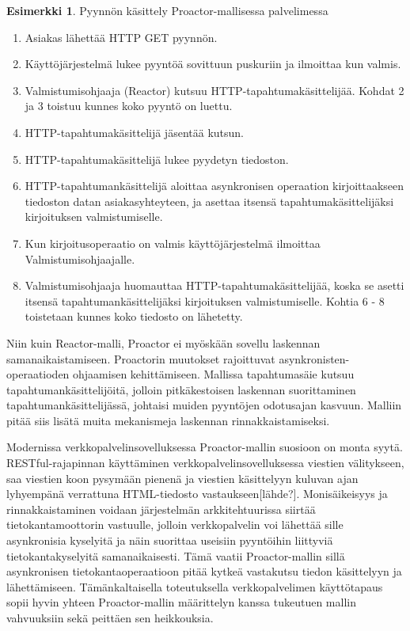 \documentclass[finnish]{tktltiki2}
\theoremstyle{definition}
\newtheorem{esim}[lau]{Esimerkki}
\theoremstyle{remark}
\begin{document}
\begin{center}
    \begin{esim}\label{esim:proactor}
        Pyynnön käsittely Proactor-mallisessa palvelimessa~\cite{pyarali_proactor_1997} \\
        \begin{enumerate}
            \item Asiakas lähettää HTTP GET pyynnön.
            \item Käyttöjärjestelmä lukee pyyntöä sovittuun puskuriin ja ilmoittaa kun valmis.
            \item Valmistumisohjaaja (Reactor) kutsuu HTTP-tapahtumakäsittelijää.
                Kohdat 2 ja 3 toistuu kunnes koko pyyntö on luettu.
            \item HTTP-tapahtumakäsittelijä jäsentää kutsun.
            \item HTTP-tapahtumakäsittelijä lukee pyydetyn tiedoston.
            \item HTTP-tapahtumankäsittelijä aloittaa asynkronisen operaation 
                kirjoittaakseen tiedoston datan asiakasyhteyteen, ja asettaa
                itsensä tapahtumakäsittelijäksi kirjoituksen valmistumiselle.
            \item Kun kirjoitusoperaatio on valmis käyttöjärjestelmä ilmoittaa
                Valmistumisohjaajalle.
            \item Valmistumisohjaaja huomauttaa HTTP-tapahtumakäsittelijää,
                koska se asetti itsensä tapahtumankäsittelijäksi kirjoituksen 
                valmistumiselle. Kohtia 6 - 8 toistetaan kunnes koko tiedosto on lähetetty. 
        \end{enumerate}
    \end{esim}
\end{center}
Niin kuin Reactor-malli, Proactor ei myöskään sovellu laskennan samanaikaistamiseen.
Proactorin muutokset rajoittuvat asynkronisten-operaatioden ohjaamisen 
kehittämiseen. Mallissa tapahtumasäie kutsuu tapahtumankäsittelijöitä, jolloin
pitkäkestoisen laskennan suorittaminen tapahtumankäsittelijässä, johtaisi
muiden pyyntöjen odotusajan kasvuun. Malliin pitää siis
lisätä muita mekanismeja laskennan rinnakkaistamiseksi.

Modernissa verkkopalvelinsovelluksessa Proactor-mallin suosioon on
monta syytä. RESTful-rajapinnan käyttäminen
verkkopalvelinsovelluksessa viestien välitykseen,
saa viestien koon pysymään pienenä ja viestien
käsittelyyn kuluvan ajan lyhyempänä verrattuna
HTML-tiedosto vastaukseen[lähde?]. %
Monisäikeisyys ja rinnakkaistaminen
voidaan järjestelmän arkkitehtuurissa siirtää tietokantamoottorin vastuulle,
jolloin verkkopalvelin voi lähettää sille asynkronisia kyselyitä
ja näin suorittaa useisiin pyyntöihin liittyviä tietokantakyselyitä
samanaikaisesti. Tämä vaatii Proactor-mallin sillä asynkronisen tietokantaoperaatioon
pitää kytkeä vastakutsu tiedon käsittelyyn ja lähettämiseen.
Tämänkaltaisella toteutuksella verkkopalvelimen käyttötapaus sopii
hyvin yhteen Proactor-mallin määrittelyn kanssa tukeutuen
mallin vahvuuksiin sekä peittäen sen heikkouksia.
\end{document}
